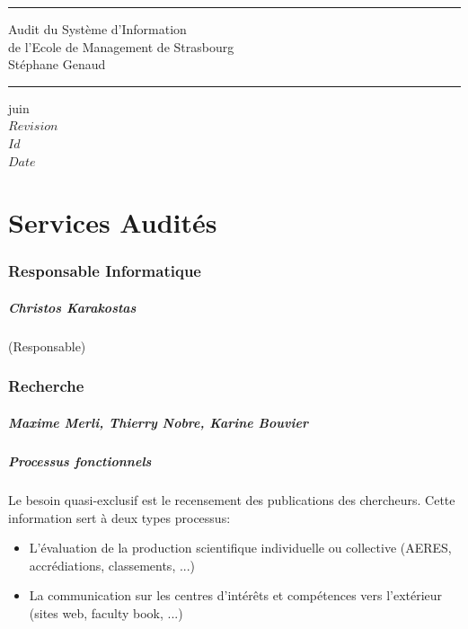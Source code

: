 \documentclass{book}
\begin{document}
\newcommand{\motcle}[1]{\index{#1}\emph{#1}}
\newcommand{\instrcle}[1]{\index{\texttt{#1}}\texttt{#1}}

\thispagestyle{empty}
\rhead[]{}
\pagestyle{fancy}
\setlength{\parindent}{0mm}
\setlength{\parskip}{0mm}
\rule{\linewidth}{1mm}
\begin{center}
\Large{Audit du Système d'Information}\\[5mm]
\Large{de l'Ecole de Management de Strasbourg}\\[5mm]
\large{Stéphane Genaud}
\rule{\linewidth}{1mm}
\end{center}
\begin{center}
juin  \\
\textrm{
$Revision$\\
$Id$\\
$Date$\\
}
\end{center}

\tableofcontents
\newpage

 
 

\chapter{Services Audités}
 

\subsection{Responsable Informatique}

\paragraph{Christos Karakostas} (Responsable)


\subsection{Recherche}
\paragraph{Maxime Merli, Thierry Nobre, Karine Bouvier}

\paragraph{Processus fonctionnels}
Le besoin quasi-exclusif est le recensement des publications des chercheurs.
Cette information sert à deux types processus:
\begin{itemize}
\item L'évaluation de la production scientifique individuelle ou collective (AERES, accrédiations, classements, ...)
\item La communication sur les centres d'intérêts et compétences vers l'extérieur (sites web, faculty book, ...)
\end{itemize}
\end{document}
